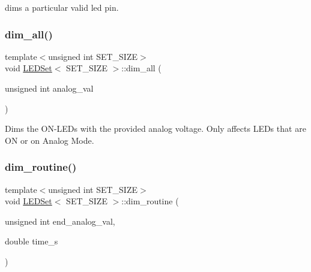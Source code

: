 dims a particular valid led pin. 

\mbox{\label{classLEDSet_ad8313aa0c4fc34cd3481db0fade6318c}} 
\subsubsection{\texorpdfstring{dim\+\_\+all()}{dim\_all()}}
{\footnotesize\ttfamily template$<$unsigned int S\+E\+T\+\_\+\+S\+I\+ZE$>$ \\
void \hyperlink{classLEDSet}{L\+E\+D\+Set}$<$ S\+E\+T\+\_\+\+S\+I\+ZE $>$\+::dim\+\_\+all (\begin{DoxyParamCaption}\item[{unsigned int}]{analog\+\_\+val }\end{DoxyParamCaption})\hspace{0.3cm}{\ttfamily [inline]}}



Dims the O\+N-\/\+L\+E\+Ds with the provided analog voltage. Only affects L\+E\+Ds that are ON or on Analog Mode. 

\mbox{\label{classLEDSet_a02a191f4c6755092ffe30cca34922734}} 
\subsubsection{\texorpdfstring{dim\+\_\+routine()}{dim\_routine()}}
{\footnotesize\ttfamily template$<$unsigned int S\+E\+T\+\_\+\+S\+I\+ZE$>$ \\
void \hyperlink{classLEDSet}{L\+E\+D\+Set}$<$ S\+E\+T\+\_\+\+S\+I\+ZE $>$\+::dim\+\_\+routine (\begin{DoxyParamCaption}\item[{unsigned int}]{end\+\_\+analog\+\_\+val,  }\item[{double}]{time\+\_\+s }\end{DoxyParamCaption})\hspace{0.3cm}{\ttfamily [inline]}}

\mbox{\label{classLEDSet_aa392b74b090de60a25f7577195327afd}} 
